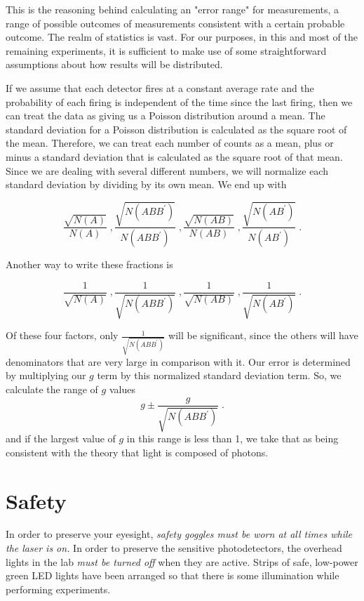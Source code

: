 This is the reasoning behind calculating an "error range" for measurements, a range of possible outcomes of measurements consistent with a certain probable outcome. The realm of statistics is vast. For our purposes, in this and most of the remaining experiments, it is sufficient to make use of some straightforward assumptions about how results will be distributed.

If we assume that each detector fires at a constant average rate and the probability of each firing is independent of the time since the last firing, then we can treat the data as giving us a Poisson distribution around a mean.  The standard deviation for a Poisson distribution is calculated as the square root of the mean.  Therefore, we can treat each number of counts as a mean, plus or minus a standard deviation that is calculated as the square root of that mean.  Since we are dealing with several different numbers, we will normalize each standard deviation by dividing by its own mean.  We end up with

\[\frac{\sqrt{N(A)}}{N(A)}\;, \frac{\sqrt{N(ABB^\prime)}}{N(ABB^\prime)}\;, \frac{\sqrt{N(AB)}}{N(AB)}\;, \frac{\sqrt{N(AB^\prime)}}{N(AB^\prime)}\;.    \]

Another way to write these fractions is

\[\frac{1}{\sqrt{N(A)}}\;, \frac{1}{\sqrt{N(ABB^\prime)}}\;, \frac{1}{\sqrt{N(AB)}}\;,\frac{1}{\sqrt{N(AB^\prime)}}\;. \]  

Of these four factors, only $\frac{1}{\sqrt{N(ABB^\prime)}}$ will be significant, since the others will have denominators that are very large in comparison with it.  Our error is determined by multiplying our $g$ term by this normalized standard deviation term.  So, we calculate the range of $g$ values
\begin{equation*}
g \pm \frac{g}{\sqrt{N(ABB^\prime)}}\;.
\end{equation*}
and if the largest value of $g$ in this range is less than 1, we take that as being consistent with the theory that light is composed of photons.

\section*{Safety}

In order to preserve your eyesight, \emph{safety goggles must be worn at all times while the laser is on.} In order to preserve the sensitive photodetectors, the overhead lights in the lab \emph{must be turned off} when they are active. Strips of safe, low-power green LED lights have been arranged so that there is some illumination while performing experiments.
